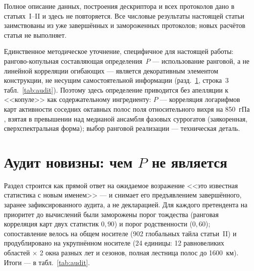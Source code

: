 \documentclass[11pt,a4paper]{article}
\begin{document}
Полное описание данных, построения дескриптора и всех протоколов дано в статьях~I--II и здесь не повторяется. Все числовые результаты настоящей статьи заимствованы из уже завершённых и замороженных протоколов; новых расчётов статья не выполняет.

Единственное методическое уточнение, специфичное для настоящей работы: рангово-копульная составляющая определения~$P$ --- использование ранговой, а не линейной корреляции огибающих --- является декоративным элементом конструкции, не несущим самостоятельной информации (разд.~\ref{sec:audit}, строка~3 табл.~\ref{tab:audit}). Поэтому здесь определение приводится без апелляции к <<копуле>> как содержательному ингредиенту: $P$ --- корреляция логарифмов карт активности соседних октавных полос поля относительного вихря на 850~гПа \cite{Hersbach2020,Soci2024}, взятая в превышении над медианой ансамбля фазовых суррогатов (заякоренная, сверхспектральная форма); выбор ранговой реализации --- техническая деталь.

\section{Аудит новизны: чем $P$ не является}
\label{sec:audit}

Раздел строится как прямой ответ на ожидаемое возражение <<это известная статистика с новым именем>> --- и снимает его предъявлением завершённого, заранее зафиксированного аудита, а не декларацией. Для каждого претендента на приоритет до вычислений были заморожены порог тождества (ранговая корреляция карт двух статистик $0{,}90$) и порог родственности ($0{,}60$); сопоставление велось на общем носителе (902 глобальных тайла статьи~II) и продублировано на укрупнённом носителе (24 единицы: 12 равновеликих областей $\times$ 2 окна разных лет и сезонов, полная лестница полос до 1600~км). Итоги --- в табл.~\ref{tab:audit}.
\end{document}

